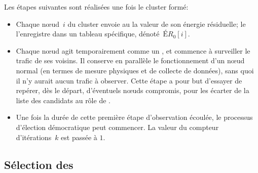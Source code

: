 Les étapes suivantes sont réalisées une fois le cluster formé:
\begin{itemize}
    \item Chaque nœud~$i$ du cluster envoie au \ch la valeur de son énergie résiduelle; le \CH l'enregistre dans un tableau spécifique, dénoté~$\mathit{ÉR}_0[i]$.
    \item Chaque nœud agit temporairement comme un \cn, et commence à surveiller le trafic de ses voisins. Il conserve en parallèle le fonctionnement d'un nœud normal (en termes de mesure physiques et de collecte de données), sans quoi il n'y aurait aucun trafic à observer. Cette étape a pour but d'essayer de repérer, dès le départ, d'éventuels nœuds compromis, pour les écarter de la liste des candidats au rôle de \cn.
    \item Une fois la durée de cette première étape d'observation écoulée, le processus d'élection démocratique peut commencer. La valeur du compteur d'itérations~$k$ est passée à $1$.
\end{itemize}

    \subsection{Sélection des \cns}

